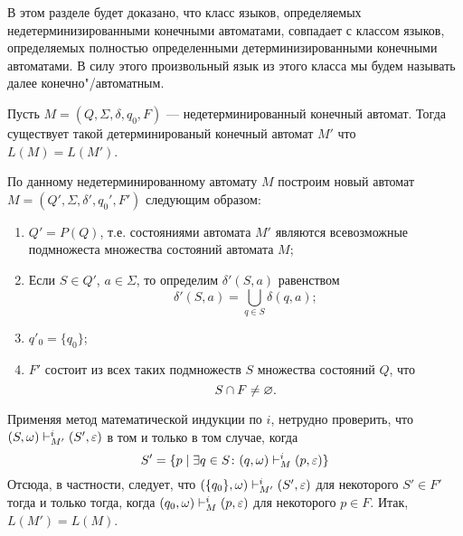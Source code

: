 В этом разделе будет доказано, что класс языков, определяемых недетерминизированными конечными автоматами, совпадает с классом языков, определяемых полностью определенными детерминизированными конечными автоматами. В силу этого произвольный язык из этого класса мы будем называть далее конечно"/автоматным.

\begin{mytheorem}
\label{theorem-reduction-NKAtoDKA}
Пусть $M=(Q,\Sigma,\delta,q_0,F)$ --- недетерминированный конечный автомат. Тогда существует такой детерминированый конечный автомат $M'$ что $L(M) = L(M')$.
\end{mytheorem}

\begin{myproof}
По данному недетерминированному автомату $M$ построим новый автомат $M=(Q',\Sigma,\delta ',q_0',F')$ следующим образом:
\begin{enumerate}
\item $Q'=P(Q)$, т.е. состояниями автомата $M'$ являются всевозможные подмножеста множества состояний автомата $M$;
\item Если $S\in Q'$, $a\in\Sigma$, то определим $\delta '(S,a)$ равенством
\[
	\delta '(S,a) = \bigcup_{q\in S} \delta(q,a);
\]

\item $q'_0=\{q_0\}$;

\item $F'$ состоит из всех таких подмножеств $S$ множества состояний $Q$, что \[
	S\cap F\neq\varnothing.
\]
\end{enumerate}
Применяя метод математической индукции по $i$, нетрудно проверить, что $(S,\omega)\vdash_{M'}^i(S',\varepsilon)$ в том и только в том случае, когда
\[
S'=\{p\mid\exists q\in S\colon (q,\omega)\vdash_M^i(p,\varepsilon)\}
\]
Отсюда, в частности, следует, что $(\{q_0\},\omega)\vdash_{M'}^i(S',\varepsilon)$ для некоторого $S'\in F'$ тогда и только тогда, когда $(q_0,\omega)\vdash_M^i(p,\varepsilon)$ для некоторого $p\in F$. Итак, $L(M')=L(M)$.
\end{myproof}


